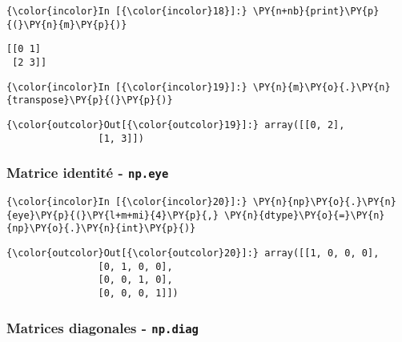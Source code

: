     \begin{Verbatim}[commandchars=\\\{\}]
{\color{incolor}In [{\color{incolor}18}]:} \PY{n+nb}{print}\PY{p}{(}\PY{n}{m}\PY{p}{)}
\end{Verbatim}


    \begin{Verbatim}[commandchars=\\\{\}]
[[0 1]
 [2 3]]

    \end{Verbatim}

    \begin{Verbatim}[commandchars=\\\{\}]
{\color{incolor}In [{\color{incolor}19}]:} \PY{n}{m}\PY{o}{.}\PY{n}{transpose}\PY{p}{(}\PY{p}{)}
\end{Verbatim}


\begin{Verbatim}[commandchars=\\\{\}]
{\color{outcolor}Out[{\color{outcolor}19}]:} array([[0, 2],
                [1, 3]])
\end{Verbatim}
            
    \hypertarget{matrice-identituxe9---np.eye}{%
\subsubsection{\texorpdfstring{Matrice identité -
\texttt{np.eye}}{Matrice identité - np.eye}}\label{matrice-identituxe9---np.eye}}

    \begin{Verbatim}[commandchars=\\\{\}]
{\color{incolor}In [{\color{incolor}20}]:} \PY{n}{np}\PY{o}{.}\PY{n}{eye}\PY{p}{(}\PY{l+m+mi}{4}\PY{p}{,} \PY{n}{dtype}\PY{o}{=}\PY{n}{np}\PY{o}{.}\PY{n}{int}\PY{p}{)}
\end{Verbatim}


\begin{Verbatim}[commandchars=\\\{\}]
{\color{outcolor}Out[{\color{outcolor}20}]:} array([[1, 0, 0, 0],
                [0, 1, 0, 0],
                [0, 0, 1, 0],
                [0, 0, 0, 1]])
\end{Verbatim}
            
    \hypertarget{matrices-diagonales---np.diag}{%
\subsubsection{\texorpdfstring{Matrices diagonales -
\texttt{np.diag}}{Matrices diagonales - np.diag}}\label{matrices-diagonales---np.diag}}

